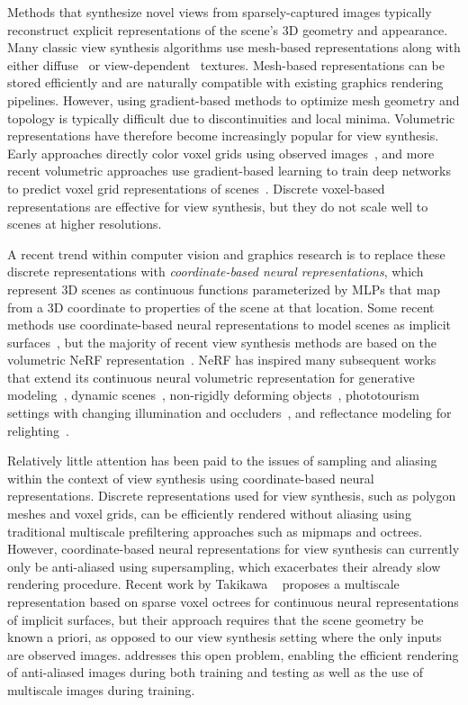 \documentclass[10pt,twocolumn,letterpaper]{article}
\begin{document}
Methods that synthesize novel views from sparsely-captured images typically reconstruct explicit representations of the scene's 3D geometry and appearance. Many classic view synthesis algorithms use mesh-based representations along with either diffuse~\cite{waechter2014} or view-dependent~\cite{buehler01, debevec96, wood00} textures. Mesh-based representations can be stored efficiently and are naturally compatible with existing graphics rendering pipelines. However, using gradient-based methods to optimize mesh geometry and topology is typically difficult due to discontinuities and local minima. Volumetric representations have therefore become increasingly popular for view synthesis. Early approaches directly color voxel grids using observed images~\cite{seitz99}, and more recent volumetric approaches use gradient-based learning to train deep networks to predict voxel grid representations of scenes~\cite{flynn19,neuralvolumes,mildenhall2019,sitzmann19,srinivasan19,zhou18}. Discrete voxel-based representations are effective for view synthesis, but they do not scale well to scenes at higher resolutions.

A recent trend within computer vision and graphics research is to replace these discrete representations with \emph{coordinate-based neural representations}, which represent 3D scenes as continuous functions parameterized by MLPs that map from a 3D coordinate to properties of the scene at that location. Some recent methods use coordinate-based neural representations to model scenes as implicit surfaces~\cite{niemeyer2020dvr, yariv2020multiview}, but the majority of recent view synthesis methods are based on the volumetric NeRF representation~\cite{mildenhall2020}. NeRF has inspired many subsequent works that extend its continuous neural volumetric representation for generative modeling~\cite{chan2020pi, schwarz2020graf}, dynamic scenes~\cite{li2021, ost2020neural}, non-rigidly deforming objects~\cite{gafni2020dynamic, park2020deformable}, phototourism settings with changing illumination and occluders~\cite{martinbrualla2020nerfw, tancik2020meta}, and reflectance modeling for relighting~\cite{bi2020, boss2020nerd, nerv2021}.


Relatively little attention has been paid to the issues of sampling and aliasing within the context of view synthesis using coordinate-based neural representations. Discrete representations used for view synthesis, such as polygon meshes and voxel grids, can be efficiently rendered without aliasing using traditional multiscale prefiltering approaches such as mipmaps and octrees. However, coordinate-based neural representations for view synthesis can currently only be anti-aliased using supersampling, which exacerbates their already slow rendering procedure. 
Recent work by Takikawa \etal~\cite{takikawa21} proposes a multiscale representation based on sparse voxel octrees for continuous neural representations of implicit surfaces, but their approach requires that the scene geometry be known a priori, as opposed to our view synthesis setting where the only inputs are observed images. 
\shortmodelname addresses this open problem, enabling the efficient rendering of anti-aliased images during both training and testing as well as the use of multiscale images during training.
\end{document}
